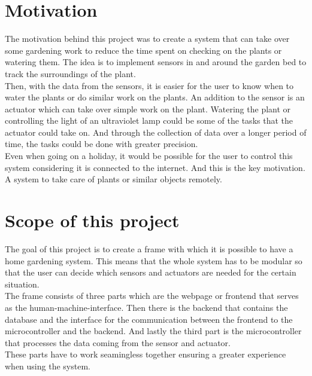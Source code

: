 \section{Motivation}\label{motivation}

The motivation behind this project was to create a system that can take over some gardening work to reduce the time spent on checking on the plants or watering them. The idea is to implement sensors in and around the garden bed to track the surroundings of the plant. \\

Then, with the data from the sensors, it is easier for the user to know when to water the plants or do similar work on the plants. An addition to the sensor is an actuator which can take over simple work on the plant. Watering the plant or controlling the light of an ultraviolet lamp could be some of the tasks that the actuator could take on. And through the collection of data over a longer period of time, the tasks could be done with greater precision. \\

Even when going on a holiday, it would be possible for the user to control this system considering it is connected to the internet. And this is the key motivation. A system to take care of plants or similar objects remotely. \\










\section{Scope of this project}\label{scope}

The goal of this project is to create a frame with which it is possible to have a home gardening system. This means that the whole system has to be modular so that the user can decide which sensors and actuators are needed for the certain situation. \\

The frame consists of three parts which are the webpage or frontend that serves as the human-machine-interface. Then there is the backend that contains the database and the interface for the communication between the frontend to the microcontroller and the backend. And lastly the third part is the microcontroller that processes the data coming from the sensor and actuator. \\

These parts have to work seamingless together ensuring a greater experience when using the system. 

